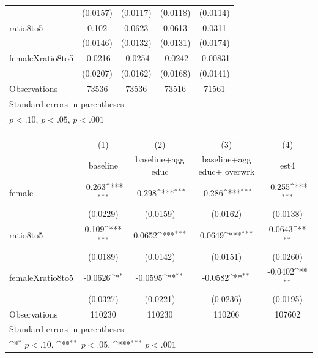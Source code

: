 \begin{table}[htbp]
{\begin{tabular}{l*{4}{c}}
                    &    (0.0157)         &    (0.0117)         &    (0.0118)         &    (0.0114)         \\
[1em]
ratio8to5           &       0.102\sym{***}&      0.0623\sym{***}&      0.0613\sym{***}&      0.0311\sym{*}  \\
                    &    (0.0146)         &    (0.0132)         &    (0.0131)         &    (0.0174)         \\
[1em]
femaleXratio8to5    &     -0.0216         &     -0.0254         &     -0.0242         &    -0.00831         \\
                    &    (0.0207)         &    (0.0162)         &    (0.0168)         &    (0.0141)         \\
\hline
Observations        &       73536         &       73536         &       73516         &       71561         \\
\hline\hline
\multicolumn{5}{l}{\footnotesize Standard errors in parentheses}\\
\multicolumn{5}{l}{\footnotesize \sym{*} \(p<.10\), \sym{**} \(p<.05\), \sym{***} \(p<.001\)}\\
\end{tabular}
}
{
\def\sym#1{\ifmmode^{#1}\else\(^{#1}\)\fi}
\begin{tabular}{l*{4}{c}}
\hline\hline
                    &\multicolumn{1}{c}{(1)}&\multicolumn{1}{c}{(2)}&\multicolumn{1}{c}{(3)}&\multicolumn{1}{c}{(4)}\\
                    &\multicolumn{1}{c}{baseline }&\multicolumn{1}{c}{baseline+agg educ}&\multicolumn{1}{c}{baseline+agg educ+ overwrk}&\multicolumn{1}{c}{est4}\\
\hline
female              &      -0.263\sym{***}&      -0.298\sym{***}&      -0.286\sym{***}&      -0.255\sym{***}\\
                    &    (0.0229)         &    (0.0159)         &    (0.0162)         &    (0.0138)         \\
[1em]
ratio8to5           &       0.109\sym{***}&      0.0652\sym{***}&      0.0649\sym{***}&      0.0643\sym{**} \\
                    &    (0.0189)         &    (0.0142)         &    (0.0151)         &    (0.0260)         \\
[1em]
femaleXratio8to5    &     -0.0626\sym{*}  &     -0.0595\sym{**} &     -0.0582\sym{**} &     -0.0402\sym{**} \\
                    &    (0.0327)         &    (0.0221)         &    (0.0236)         &    (0.0195)         \\
\hline
Observations        &      110230         &      110230         &      110206         &      107602         \\
\hline\hline
\multicolumn{5}{l}{\footnotesize Standard errors in parentheses}\\
\multicolumn{5}{l}{\footnotesize \sym{*} \(p<.10\), \sym{**} \(p<.05\), \sym{***} \(p<.001\)}\\
\end{tabular}
}
\end{table}
